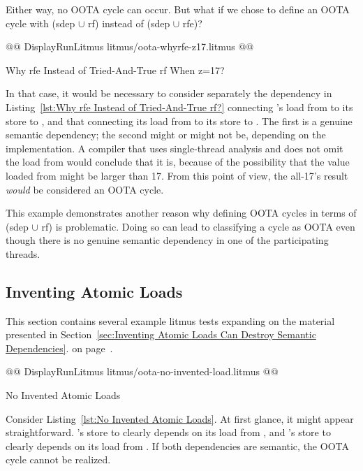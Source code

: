 \documentclass[10]{article}
\begin{document}
Either way, no OOTA cycle can occur.
But what if we chose to define an OOTA cycle with (sdep $\cup$ rf) instead
of (sdep $\cup$ rfe)?

\begin{listing}[tbp]
@@ DisplayRunLitmus litmus/oota-whyrfe-z17.litmus @@
\caption{Why rfe Instead of Tried-And-True rf When z=17?}
\label{lst:Why rfe Instead of Tried-And-True rf When z=17?}
\end{listing}

In that case, it would be necessary to consider separately the dependency
in Listing~\ref{lst:Why rfe Instead of Tried-And-True rf?}
connecting 's load from  to its store to ,
and that connecting its load from  to its store to .
The first is a genuine semantic dependency; the second might or might
not be, depending on the implementation.
A compiler that uses single-thread analysis and does not omit the load
from  would conclude that it is, because of the
possibility that the value loaded from  might be larger than 17.
From this point of view, the all-17's result \emph{would} be
considered an OOTA cycle.

This example demonstrates another reason why defining OOTA cycles
in terms of (sdep $\cup$ rf) is problematic.
Doing so can lead to classifying a cycle as OOTA even though there
is no genuine semantic dependency in one of the participating threads.

\subsection{Inventing Atomic Loads}
\label{app:Inventing Atomic Loads}

This section contains several example litmus tests
expanding on the material presented in
Section~\ref{sec:Inventing Atomic Loads Can Destroy Semantic Dependencies}.
on
page~\pageref{sec:Inventing Atomic Loads Can Destroy Semantic Dependencies}.

\begin{listing}[tbp]
@@ DisplayRunLitmus litmus/oota-no-invented-load.litmus @@
\caption{No Invented Atomic Loads}
\label{lst:No Invented Atomic Loads}
\end{listing}

Consider Listing~\ref{lst:No Invented Atomic Loads}.
At first glance, it might appear straightforward.
's store to  clearly depends on its load from ,
and 's store to  clearly depends on its load from .
If both dependencies are semantic, the OOTA cycle cannot be realized.
\end{document}
